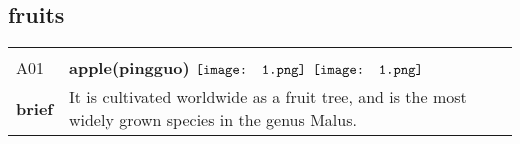 \documentclass[UTF8]{article}
\begin{document}
    \subsection{\Large fruits}
    \vspace{-10pt}
            \begin{tabularx}{\textwidth}{p{1.5cm}X}
            \arrayrulecolor{myBlue}
        	\hline\\
            \small{A01}&
            \large{\bfseries{apple(pingguo)}}\hfill
                                                            $\vcenter{\hbox{\texttt{[image: 1.png]}}}$
                                                                \phantom{$\vcenter{\hbox{\texttt{[image: 1.png]}}}$}
                                                                \phantom{$\vcenter{\hbox{\texttt{[image: 1.png]}}}$}
                                                                \phantom{$\vcenter{\hbox{\texttt{[image: 1.png]}}}$}
                                                                \phantom{$\vcenter{\hbox{\texttt{[image: 1.png]}}}$}
                                                                $\vcenter{\hbox{\texttt{[image: 1.png]}}}$
                                                                \phantom{$\vcenter{\hbox{\texttt{[image: 1.png]}}}$}
                                        \\[10pt]
            \large{\bfseries{brief}}&\noindent\parbox[c]{\hsize}{It is cultivated worldwide as a fruit tree, and is the most widely grown species in the genus Malus.} \\[5pt]
            \hline\\[-10pt]
        \end{tabularx}
\end{document}
